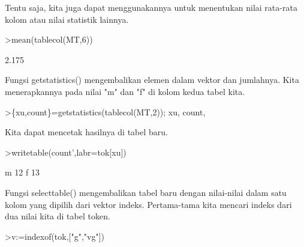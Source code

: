 \documentclass[a4paper,10pt]{article}
\begin{document}
\begin{eulernotebook}
\begin{eulercomment}
\begin{eulercomment}
\begin{eulercomment}
\begin{eulercomment}
\begin{eulercomment}
\begin{eulercomment}
\begin{eulercomment}
\begin{eulercomment}
\begin{eulercomment}
\begin{eulercomment}
\begin{eulercomment}
\begin{eulercomment}
\begin{eulercomment}
\begin{eulercomment}
\begin{eulercomment}
\begin{eulercomment}
\begin{eulercomment}
\begin{eulercomment}
\begin{eulercomment}
\begin{eulercomment}
\begin{eulercomment}
\begin{eulercomment}
\begin{eulercomment}
\begin{eulercomment}
\begin{eulercomment}
\begin{eulercomment}
\begin{eulercomment}
\begin{eulercomment}
\begin{eulercomment}
\begin{eulercomment}
\begin{eulercomment}
\begin{eulercomment}
\begin{eulercomment}
Tentu saja, kita juga dapat menggunakannya untuk menentukan nilai
rata-rata kolom atau nilai statistik lainnya.
\end{eulercomment}
\begin{eulerprompt}
>mean(tablecol(MT,6))
\end{eulerprompt}
\begin{euleroutput}
  2.175
\end{euleroutput}
\begin{eulercomment}
Fungsi getstatistics() mengembalikan elemen dalam vektor dan
jumlahnya. Kita menerapkannya pada nilai "m" dan "f" di kolom kedua
tabel kita.
\end{eulercomment}
\begin{eulerprompt}
>\{xu,count\}=getstatistics(tablecol(MT,2)); xu, count,
\end{eulerprompt}
\begin{euleroutput}
  [1,  3]
  [12,  13]
\end{euleroutput}
\begin{eulercomment}
Kita dapat mencetak hasilnya di tabel baru.
\end{eulercomment}
\begin{eulerprompt}
>writetable(count',labr=tok[xu])
\end{eulerprompt}
\begin{euleroutput}
           m        12
           f        13
\end{euleroutput}
\begin{eulercomment}
Fungsi selecttable() mengembalikan tabel baru dengan nilai-nilai dalam
satu kolom yang dipilih dari vektor indeks. Pertama-tama kita mencari
indeks dari dua nilai kita di tabel token.
\end{eulercomment}
\begin{eulerprompt}
>v:=indexof(tok,["g","vg"])
\end{eulerprompt}
\begin{euleroutput}
  [5,  6]

\end{euleroutput}
\end{eulercomment}
\end{eulercomment}
\end{eulercomment}
\end{eulercomment}
\end{eulercomment}
\end{eulercomment}
\end{eulercomment}
\end{eulercomment}
\end{eulercomment}
\end{eulercomment}
\end{eulercomment}
\end{eulercomment}
\end{eulercomment}
\end{eulercomment}
\end{eulercomment}
\end{eulercomment}
\end{eulercomment}
\end{eulercomment}
\end{eulercomment}
\end{eulercomment}
\end{eulercomment}
\end{eulercomment}
\end{eulercomment}
\end{eulercomment}
\end{eulercomment}
\end{eulercomment}
\end{eulercomment}
\end{eulercomment}
\end{eulercomment}
\end{eulercomment}
\end{eulercomment}
\end{eulercomment}
\end{eulernotebook}
\end{document}
